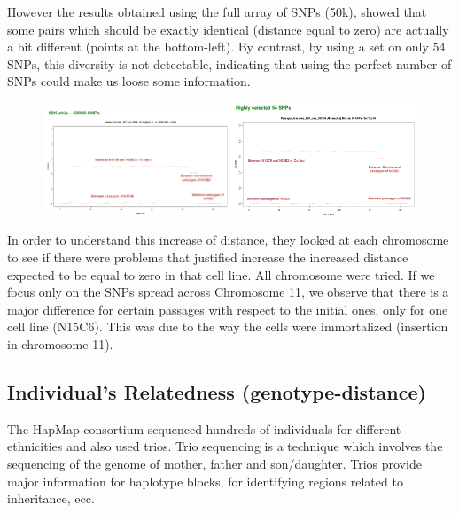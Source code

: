 However the results obtained using the full array of SNPs (50k), showed that
some pairs which should be exactly identical (distance equal to zero) are
actually a bit different (points at the bottom-left). By contrast, by using a
set on only 54 SNPs, this diversity is not detectable, indicating  that using
the perfect number of SNPs could make us loose some information. 

\begin{figure}
	\centering
	\includegraphics[width=0.5\textwidth]{cell_lines_1.PNG}\quad\includegraphics[width=0.5\textwidth]{cell_lines_2.PNG}
	\caption{\label{fig: cell_lines}}
\end{figure}

In order to understand this increase of distance, they looked at each chromosome
to see if there were problems that justified increase the increased distance
expected to be equal to zero in that cell line. All chromosome were tried. If we
focus only on the SNPs spread across Chromosome 11, we observe that there is a
major difference for certain passages with respect to the initial ones, only for
one cell line (N15C6). This was due to the way the cells were immortalized
(insertion in chromosome 11).


\subsection{Individual's Relatedness (genotype-distance)}

The HapMap consortium sequenced hundreds of individuals for different
ethnicities and also used trios. Trio sequencing is a technique which involves
the sequencing of the genome of mother, father and son/daughter. Trios provide
major information for haplotype blocks, for identifying regions related to
inheritance, ecc. 

